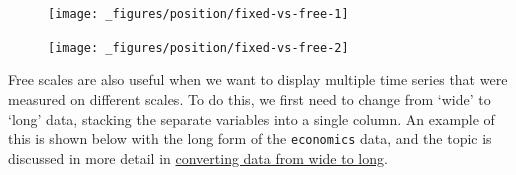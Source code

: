 \begin{figure}[H]
  \centering
  \texttt{[image: \_figures/position/fixed-vs-free-1]}%
\end{figure}

\begin{Shaded}
\begin{Highlighting}[]
\OperatorTok{+}\StringTok{ }\NormalTok{(}\OperatorTok{~} \NormalTok{)}
\end{Highlighting}
\end{Shaded}

\begin{figure}[H]
  \centering
  \texttt{[image: \_figures/position/fixed-vs-free-2]}
\end{figure}

Free scales are also useful when we want to display multiple time series
that were measured on different scales. To do this, we first need to
change from `wide' to `long' data, stacking the separate variables into
a single column. An example of this is shown below with the long form of
the \texttt{economics} data, and the topic is discussed in more detail
in \protect\hyperlink{sec:spread-gather}{converting data from wide to
long}. 

\begin{Shaded}
\begin{Highlighting}[]
\OperatorTok{+}\StringTok{ }
\StringTok{  }\NormalTok{() }\OperatorTok{+}\StringTok{ }
\StringTok{  }\NormalTok{(}\OperatorTok{~} \NormalTok{, } \NormalTok{)}
\end{Highlighting}
\end{Shaded}

